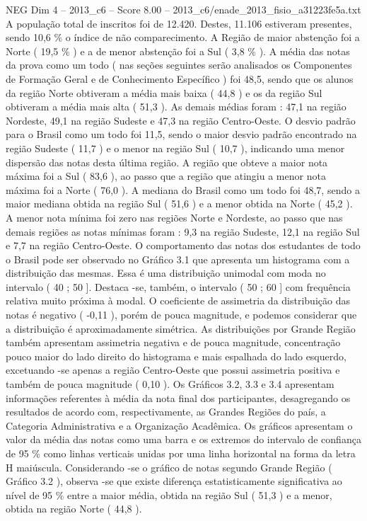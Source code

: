 \begin{textsample}{NEG Dim 4 – 2013\_c6 – Score 8.00 – 2013\_c6/enade\_2013\_fisio\_a31223fe5a.txt}
A população total de inscritos foi de 12.420.
Destes, 11.106 estiveram presentes, sendo 10,6 \% o índice de não comparecimento.
A Região de maior abstenção foi a Norte ( 19,5 \% ) e a de menor abstenção foi a Sul ( 3,8 \% ).
A média das notas da prova como um todo ( nas seções seguintes serão analisados os Componentes de Formação Geral e de Conhecimento Específico ) foi 48,5, sendo que os alunos da região Norte obtiveram a média mais baixa ( 44,8 ) e os da região Sul obtiveram a média mais alta ( 51,3 ).
As demais médias foram : 47,1 na região Nordeste, 49,1 na região Sudeste e 47,3 na região Centro-Oeste.
O desvio padrão para o Brasil como um todo foi 11,5, sendo o maior desvio padrão encontrado na região Sudeste ( 11,7 ) e o menor na região Sul ( 10,7 ), indicando uma menor dispersão das notas desta última região.
A região que obteve a maior nota máxima foi a Sul ( 83,6 ), ao passo que a região que atingiu a menor nota máxima foi a Norte ( 76,0 ).
A mediana do Brasil como um todo foi 48,7, sendo a maior mediana obtida na região Sul ( 51,6 ) e a menor obtida na Norte ( 45,2 ).
A menor nota mínima foi zero nas regiões Norte e Nordeste, ao passo que nas demais regiões as notas mínimas foram : 9,3 na região Sudeste, 12,1 na região Sul e 7,7 na região Centro-Oeste.
O comportamento das notas dos estudantes de todo o Brasil pode ser observado no Gráfico 3.1 que apresenta um histograma com a distribuição das mesmas.
Essa é uma distribuição unimodal com moda no intervalo ( 40 ; 50 ].
Destaca -se, também, o intervalo ( 50 ; 60 ] com frequência relativa muito próxima à modal.
O coeficiente de assimetria da distribuição das notas é negativo ( -0,11 ), porém de pouca magnitude, e podemos considerar que a distribuição é aproximadamente simétrica.
As distribuições por Grande Região também apresentam assimetria negativa e de pouca magnitude, concentração pouco maior do lado direito do histograma e mais espalhada do lado esquerdo, excetuando -se apenas a região Centro-Oeste que possui assimetria positiva e também de pouca magnitude ( 0,10 ).
Os Gráficos 3.2, 3.3 e 3.4 apresentam informações referentes à média da nota final dos participantes, desagregando os resultados de acordo com, respectivamente, as Grandes Regiões do país, a Categoria Administrativa e a Organização Acadêmica.
Os gráficos apresentam o valor da média das notas como uma barra e os extremos do intervalo de confiança de 95 \% como linhas verticais unidas por uma linha horizontal na forma da letra H maiúscula.
Considerando -se o gráfico de notas segundo Grande Região ( Gráfico 3.2 ), observa -se que existe diferença estatisticamente significativa ao nível de 95 \% entre a maior média, obtida na região Sul ( 51,3 ) e a menor, obtida na região Norte ( 44,8 ).

\end{textsample}
